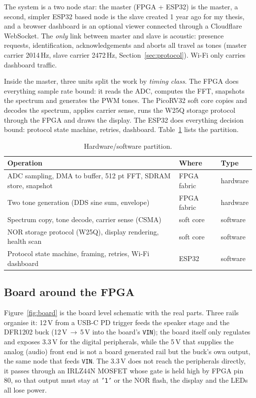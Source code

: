 \documentclass[a4paper,10pt]{article}
\begin{document}
The system is a two node star: the master (FPGA + ESP32) is the master, a second,
simpler ESP32 based node is the slave created 1 year ago for my thesis, and a browser dashboard is an optional viewer
connected through a Cloudflare WebSocket. The \emph{only} link between master
and slave is acoustic: presence requests, identification, acknowledgements and aborts
all travel as tones (master carrier 2014\,Hz, slave carrier 2472\,Hz,
Section~\ref{sec:protocol}). Wi-Fi only carries dashboard traffic.

Inside the master, three units split the work by \emph{timing class}. The FPGA
does everything sample rate bound: it reads the ADC, computes the FFT, snapshots the
spectrum and generates the PWM tones. The PicoRV32 soft core copies and decodes the spectrum, applies carrier sense,
runs the W25Q storage protocol through the FPGA and draws the display. The ESP32 does everything decision
bound: protocol state machine, retries, dashboard. Table~\ref{tab:partition} lists the
partition.

\begin{table}[H]
\centering
\caption{Hardware/software partition.}
\label{tab:partition}
\small
\begin{tabular}{lll}
\toprule
\textbf{Operation} & \textbf{Where} & \textbf{Type} \\
\midrule
ADC sampling, DMA to buffer, 512 pt FFT, SDRAM store, snapshot & FPGA fabric & hardware \\
Two tone generation (DDS sine sum, envelope) & FPGA fabric & hardware \\
Spectrum copy, tone decode, carrier sense (CSMA) & soft core & software \\
NOR storage protocol (W25Q), display rendering, health scan & soft core & software \\
Protocol state machine, framing, retries, Wi-Fi dashboard & ESP32 & software \\
\bottomrule
\end{tabular}
\end{table}

\subsection{Board around the FPGA}
\label{sec:board}

Figure~\ref{fig:board} is the board level schematic with the real parts. Three rails
organise it: 12\,V from a USB-C PD trigger feeds the speaker stage and the DFR1202
buck (12\,V\,$\to$\,5\,V into the board's \texttt{VIN}); the board itself only
regulates and exposes 3.3\,V for the digital peripherals, while the 5\,V that supplies
the analog (audio) front end is not a board generated rail but the buck's own output, the same node that feeds \texttt{VIN}. The 3.3\,V does not reach the peripherals directly, it passes through
an IRLZ44N MOSFET whose gate is held high by FPGA pin 80, so that output must stay at
\texttt{'1'} or the NOR flash, the display and the LEDs all lose power.
\end{document}
